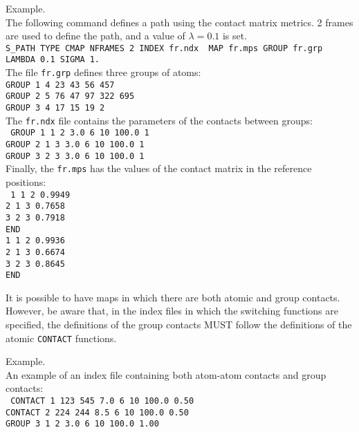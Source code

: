 \documentclass[12pt,fleqn]{report}
\newcommand{\esempio}[1]{
\vspace{10pt}
\begin{flushright}
\colorbox{light-gray}{
   \begin{minipage}{13cm}
       \scriptsize{
{\fontfamily{phv} \fontseries{b}
 \selectfont Example. \\
 \fontseries{m} \selectfont #1 } }
\end{minipage}}
\end{flushright}
\vspace{20pt}
}
\begin{document}
\esempio{
The following command defines a path
 using the contact matrix metrics. 2 frames are used to
 define the path, and a value of $\lambda=0.1$ is set.
 \vspace{10pt} \\
 {\tt S\_PATH TYPE CMAP NFRAMES 2 INDEX fr.ndx \
   MAP fr.mps GROUP fr.grp LAMBDA 0.1 SIGMA 1.}  \vspace{10pt} \\
  The file {\tt fr.grp} defines three groups of atoms:   \vspace{10pt} \\
 {\tt  GROUP 1 4 23 43 56 457 \\
 GROUP 2 5 76 47 97 322 695 \\
 GROUP 3 4 17 15 19 2}  \vspace{10pt} \\
 The {\tt  fr.ndx} file contains the parameters of the contacts between groups:  \vspace{10pt} \\
 {\tt
GROUP    1    1    2   3.0  6 10 100.0    1 \\
GROUP    2    1    3   3.0  6 10 100.0    1 \\
GROUP    3    2    3   3.0  6 10 100.0    1 } \vspace{10pt} \\
Finally, the {\tt fr.mps} has the values of the  contact matrix in the reference positions: \vspace{10pt} \\
{\tt
   1    1    2      0.9949\\
   2    1    3      0.7658\\
   3    2    3      0.7918\\
END\\
   1    1    2      0.9936\\
   2    1    3      0.6674\\
   3    2    3      0.8645\\
END }
}

It is possible to have maps in which there are both atomic and group contacts. However,
be aware that, in the index files in which the switching functions are specified, 
the definitions of the group contacts MUST follow the definitions of the atomic {\tt CONTACT} functions.
\esempio{An example of an index file containing both atom-atom contacts and
 group contacts:  \vspace{10pt} \\
{ \tt
CONTACT  1    123  545   7.0  6 10  100.0  0.50 \\
CONTACT  2    224  244   8.5  6 10  100.0  0.50 \\
GROUP    3      1    2   3.0  6 10  100.0  1.00 
}
}
\end{document}
